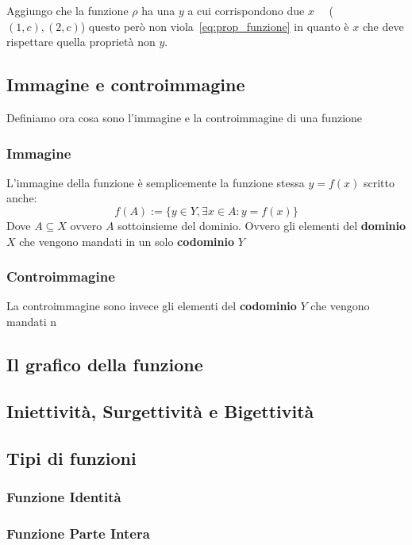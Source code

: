 \documentclass{article}
\begin{document}
Aggiungo che la funzione $ \rho $ ha una $ y $ a cui corrispondono due $ x \quad $ ($ (1,c), (2,c) $) questo però non viola~\ref{eq:prop_funzione} in quanto è $ x $ che deve rispettare quella proprietà non $ y $.  


\subsection{Immagine e controimmagine}
Definiamo ora cosa sono l'immagine e la controimmagine di una funzione

\subsubsection{Immagine}
L'immagine della funzione è semplicemente la funzione stessa $ y = f(x) $ scritto anche:
\begin{equation*}
        f(A) := \{y \in Y, \exists x \in A : y = f(x) \}
\end{equation*}
Dove $ A \subseteq X $ ovvero $ A $ sottoinsieme del dominio. \newline  
Ovvero gli elementi del \textbf{dominio} $ X $ che vengono mandati in un solo \textbf{codominio} $ Y $ 

\subsubsection{Controimmagine}
La controimmagine sono invece gli elementi del \textbf{codominio} $ Y $ che vengono mandati n  


\subsection{Il grafico della funzione}


\subsection{Iniettività, Surgettività e Bigettività}
\subsection{Tipi di funzioni}
\subsubsection{Funzione Identità}
\subsubsection{Funzione Parte Intera}
\end{document}
